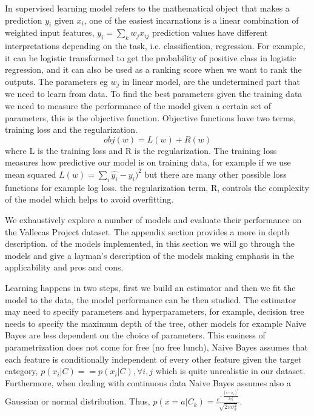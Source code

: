 \documentclass[12pt]{report}
\begin{document}
\cite{patania2017topological}
In supervised learning model refers to the mathematical object that makes a prediction $y_i$ given $x_i$, one of the easiest incarnations is a linear combination of weighted input features, $y_i = \sum_k w_j x_{ij}$ prediction values have different interpretations depending on the task, i.e. classification, regression. For example, it can be logistic transformed to get the probability of positive class in logistic regression, and it can also be used as a ranking score when we want to rank the outputs.
The parameters eg $w_j$ in linear model, are the undetermined part that we need to learn from data. To find the best parameters given the training data we need to measure the performance of the model given a certain set of parameters, this is the objective function. Objective functions have two terms, training loss and the regularization.
\begin{equation}
obj(w) = L(w) + R(w)
\end{equation}
where L is the training loss and R is the regularization. The training loss measures how predictive our model is on training data, for example if we use mean squared $L(w) = \sum_i \hat{y_i} - y_i)^2$ but there are many other possible loss functions for example log loss.
the regularization term, R, controls the complexity of the model which helps to avoid overfitting.


We exhaustively explore a number of models and evaluate their performance on the Vallecas Project dataset.
The appendix section provides a more in depth description.  of the models implemented, in this section we will
go through the models and give a layman's description of the models making emphasis in the applicability and pros and cons.

Learning happens in two steps, first we build an estimator and then we fit the model to the data, the model performance can be then studied. The estimator may need to specify parameters and hyperparameters, for example, decision tree needs to specify the maximum depth of the tree, other models for example Naive Bayes are less dependent on the choice of parameters. 
This easiness of parametrization does not come for free (no free lunch), Naive Bayes assumes that each feature is conditionally independent of every other feature given the target category, $p(x_i|C) == p(x_i|C), \forall i,j$ which is quite unrealistic in our dataset. Furthermore, when dealing with continuous data Naive Bayes assumes also a Gaussian or normal distribution. Thus, 
$p(x = a|C_k) = \frac{e^{-\frac{(a-\mu_k)^2}{2\sigma_k^{2}}}} {\sqrt{2\pi\sigma_k^{2}}}$. 
\end{document}
